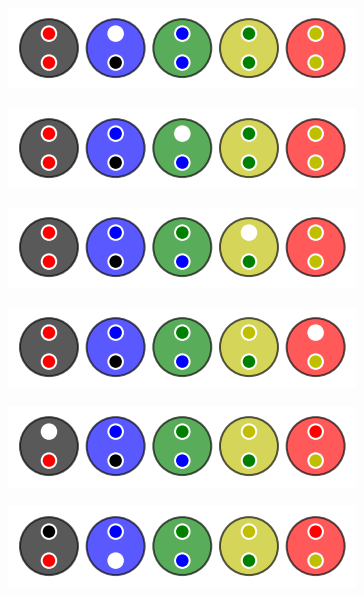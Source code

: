 \vspace{-0.4em}
\begin{multicols}{2}
	\begin{center}   %
		\includegraphics[scale= 0.45]{content/optimal/where_do_we_go/tree_sol/000.png}

		\includegraphics[scale= 0.45]{content/optimal/where_do_we_go/tree_sol/001.png}

		\includegraphics[scale= 0.45]{content/optimal/where_do_we_go/tree_sol/002.png}

		\includegraphics[scale= 0.45]{content/optimal/where_do_we_go/tree_sol/003.png}

		\includegraphics[scale= 0.45]{content/optimal/where_do_we_go/tree_sol/004.png}
	\end{center}

	\columnbreak
	\begin{center}   %
		\includegraphics[scale= 0.45]{content/optimal/where_do_we_go/tree_sol/005.png}


\end{center}
\end{multicols}
